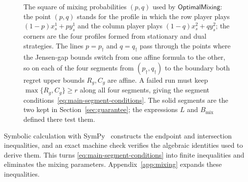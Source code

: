 \documentclass[11pt]{article}
\theoremstyle{remark}
\theoremstyle{plain}
\newcommand{\om}{\mathsf{OptimalMixing}}
\begin{document}
\begin{figure}[!htb]
\centering
{}
\caption{The square of mixing probabilities $(p,q)$ used by $\om$:
the point $(p,q)$ stands for the profile in which the row player
plays $(1-p)x_s^1+py_s^1$ and the column player plays
$(1-q)x_s^2+qy_s^2$; the corners are the four profiles formed from
stationary and dual strategies. The lines $p=p_\dagger$ and
$q=q_\dagger$ pass through the points where the Jensen-gap bounds
switch from one affine formula to the other, so on each of the four
segments from $(p_\dagger,q_\dagger)$ to the boundary both regret
upper bounds $R_g,C_g$ are affine. A failed run must keep
$\max\{R_g,C_g\}\ge r$ along all four segments, giving the segment
conditions~\eqref{eq:main-segment-conditions}. The solid segments are
the two kept in Section~\ref{sec:guarantee}; the expressions $L$ and
$B_{\mathrm{mix}}$ defined there test them.}
\label{fig:pq-square}
\end{figure}
Symbolic calculation with SymPy~\cite{sympy2017} constructs the
endpoint and intersection inequalities, and an exact machine check
verifies the algebraic identities used to derive them. This turns
\eqref{eq:main-segment-conditions} into finite inequalities and
eliminates the mixing parameters.
Appendix~\ref{app:mixing} expands these inequalities.
\end{document}
